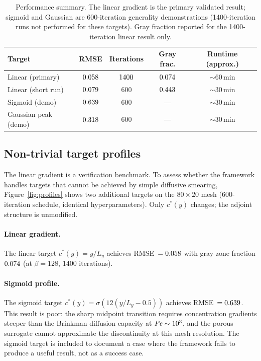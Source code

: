 \begin{table}[h]
\centering\small
\caption{Performance summary. The linear gradient is the primary
         validated result; sigmoid and Gaussian are 600-iteration
         generality demonstrations (1400-iteration runs not performed
         for these targets). Gray fraction reported for
         the 1400-iteration linear result only.}
\label{tab:performance}
\begin{tabular}{@{}lcccc@{}}
\toprule
\textbf{Target} & \textbf{RMSE} & \textbf{Iterations} & \textbf{Gray frac.} & \textbf{Runtime (approx.)} \\
\midrule
Linear (primary)    & $0.058$      & $1400$ & $0.074$ & $\sim$60\,min \\
Linear (short run)  & $0.079$    & 600             & $0.443$ & $\sim$30\,min \\
Sigmoid (demo)      & $0.639$     & 600             & ---          & $\sim$30\,min \\
Gaussian peak (demo) & $0.318$   & 600             & ---          & $\sim$30\,min \\
\bottomrule
\end{tabular}
\end{table}

\subsection{Non-trivial target profiles}
\label{sec:profiles}
The linear gradient is a verification benchmark.
To assess whether the framework handles targets that cannot be
achieved by simple diffusive smearing, Figure~\ref{fig:profiles}
shows two additional targets on the $80\times20$ mesh
(600-iteration schedule, identical hyperparameters).
Only $c^*(y)$ changes; the adjoint structure is unmodified.

\paragraph{Linear gradient.}
The linear target $c^*(y)=y/L_y$ achieves RMSE~$=0.058$
with gray-zone fraction $0.074$ (at $\beta=128$, 1400 iterations).

\paragraph{Sigmoid profile.}
The sigmoid target $c^*(y)=\sigma(12(y/L_y-0.5))$ achieves
RMSE~$=0.639$.
This result is poor: the sharp midpoint transition requires
concentration gradients steeper than the Brinkman diffusion
capacity at $\mathit{Pe}\sim10^3$, and the porous surrogate cannot
approximate the discontinuity at this mesh resolution.
The sigmoid target is included to document a case where the
framework fails to produce a useful result, not as a success case.

